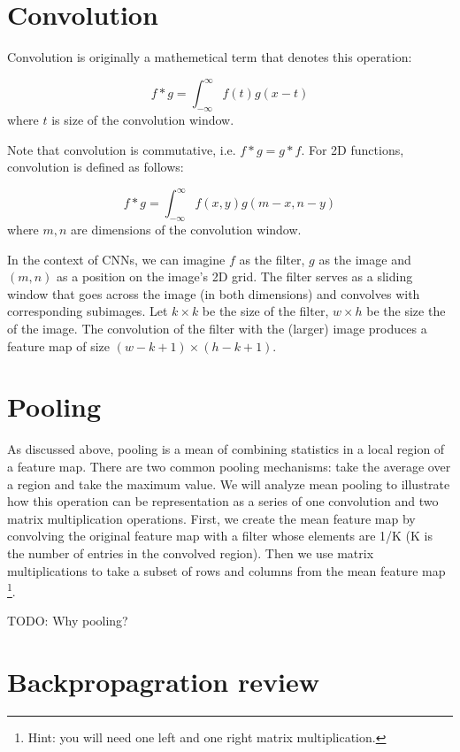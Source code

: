 \documentclass[11pt,letterpaper]{article}
\begin{document}
\section{Convolution}

Convolution is originally a mathemetical term that denotes this operation:

\begin{equation}
  f * g = \int_{-\infty}^{\infty} f(t)g(x - t)
\end{equation} where $t$ is size of the convolution window.  

Note that convolution is commutative, i.e. $f * g = g * f$. For 2D functions, convolution is defined as follows:

\begin{equation}
  f * g = \int_{-\infty}^{\infty} f(x, y) g(m - x, n - y)
\end{equation} where $m, n$ are dimensions of the convolution window. 

In the context of CNNs, we can imagine $f$ as the filter, $g$ as the image and $(m, n)$ as a position on the image's 2D grid. The filter serves as a sliding window that goes across the image (in both dimensions) and convolves with corresponding subimages. Let $k\times k$ be the size of the filter, $w \times h$ be the size the of the image. The convolution of the filter with the (larger) image produces a feature map of size $(w - k + 1)\times(h - k + 1)$.

\section{Pooling}

As discussed above, pooling is a mean of combining statistics in a local region of a feature map. There are two common pooling mechanisms: take the average over a region and take the maximum value. We will analyze mean pooling to illustrate how this operation can be representation as a series of one convolution and two matrix multiplication operations. First, we create the mean feature map by convolving the original feature map with a filter whose elements are 1/K (K is the number of entries in the convolved region). Then we use matrix multiplications to take a subset of rows and columns from the mean feature map \footnote{Hint: you will need one left and one right matrix multiplication.}.  

TODO: Why pooling?

\section{Backpropagration review}
\end{document}

